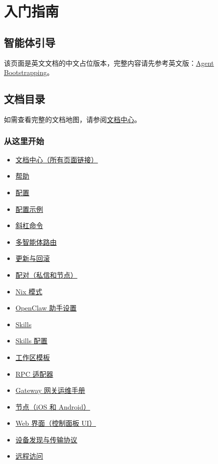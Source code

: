 \chapter{入门指南}

\section{智能体引导}


该页面是英文文档的中文占位版本，完整内容请先参考英文版：\href{/start/bootstrapping}{Agent Bootstrapping}。


\clearpage

\section{文档目录}

如需查看完整的文档地图，请参阅\href{/start/hubs}{文档中心}。

\subsection{从这里开始}


\begin{itemize}
  \item \href{/start/hubs}{文档中心（所有页面链接）}
  \item \href{/help}{帮助}
  \item \href{/gateway/configuration}{配置}
  \item \href{/gateway/configuration-examples}{配置示例}
  \item \href{/tools/slash-commands}{斜杠命令}
  \item \href{/concepts/multi-agent}{多智能体路由}
  \item \href{/install/updating}{更新与回滚}
  \item \href{/channels/pairing}{配对（私信和节点）}
  \item \href{/install/nix}{Nix 模式}
  \item \href{/start/openclaw}{OpenClaw 助手设置}
  \item \href{/tools/skills}{Skills}
  \item \href{/tools/skills-config}{Skills 配置}
  \item \href{/reference/templates/AGENTS}{工作区模板}
  \item \href{/reference/rpc}{RPC 适配器}
  \item \href{/gateway}{Gateway 网关运维手册}
  \item \href{/nodes}{节点（iOS 和 Android）}
  \item \href{/web}{Web 界面（控制面板 UI）}
  \item \href{/gateway/discovery}{设备发现与传输协议}
  \item \href{/gateway/remote}{远程访问}
\end{itemize}


